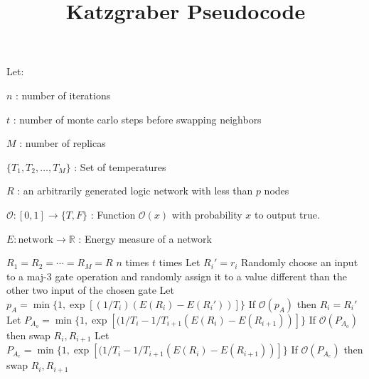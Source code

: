 \documentclass[11pt, oneside]{article}   	%
\title{Katzgraber Pseudocode}
\author{}
\date{}
\begin{document}
\maketitle

Let:

\hspace{1cm} \begin{minipage}{0.8\textwidth}
	$n$ : number of iterations
	
	$t$ : number of monte carlo steps before swapping neighbors
	
	$M$ : number of replicas
	
	$\{T_1, T_2, \ldots, T_M\}$ : Set of temperatures
	
	$R$ : an arbitrarily generated logic network with less than $p$ nodes
	
	$\mathcal O: [0,1] \rightarrow \{T, F\}$ : Function $\mathcal O(x)$ with probability $x$ to output true.
	
	$E : \text{network} \rightarrow \mathbb R$ : Energy measure of a network

\end{minipage}

\vspace{1cm}

\begin{algorithmic}
\State $R_1 = R_2 = \cdots = R_M = R$
\State 
	\Loop \;$n$ times
			\Loop \; $t$ times
				\State Let $R_i' = r_i$
				\State
				\State Randomly choose an input to a maj-3 gate operation and randomly assign it
				to a value different than the other two input of the chosen gate
				\State
				\State Let $p_A = \min\{1, \exp\left[ (1/T_i) (E(R_i)-E(R_i')) \right] \}$
				\State
				\State If $\mathcal O(p_A)$ then $R_i = R_i'$
			\EndLoop
		\EndFor
		\State
			\State Let $P_{A_o} = \min\{1, \exp\left[ (1/T_i -1/T_{i+1} (E(R_i)-E(R_{i+1})) \right] \}$
			\State If $\mathcal O(P_{A_o})$ then swap $R_i, R_{i+1}$ 
		\EndFor
		\State
			\State Let $P_{A_e} = \min\{1, \exp\left[ (1/T_i -1/T_{i+1} (E(R_i)-E(R_{i+1})) \right] \}$
			\State If $\mathcal O(P_{A_e})$ then swap $R_i, R_{i+1}$ 
		\EndFor
	\EndLoop
				
\end{algorithmic}
\end{document}
